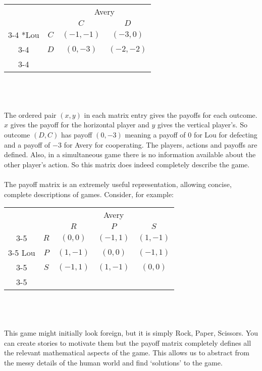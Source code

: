 \setlength{\extrarowheight}{2pt}
\begin{tabular}{cc|c|c|}
	\centering
	& \multicolumn{1}{c}{} & \multicolumn{2}{c}{Avery}\\
	& \multicolumn{1}{c}{} & \multicolumn{1}{c}{$C$}  & \multicolumn{1}{c}{$D$} \\\cline{3-4}
	\multirow{2}*{Lou}  & $C$ & $(-1,-1)$ & $(-3,0)$ \\\cline{3-4}
	& $D$ & $(0,-3)$ & $(-2,-2)$ \\\cline{3-4}
\end{tabular}
\\
\\
\\
The ordered pair $(x,y)$ in each matrix entry gives the payoffs for each outcome. $x$ gives the payoff for the horizontal player and $y$ gives the vertical player's. So outcome $(D,C)$ has payoff $(0,-3)$ meaning a payoff of $0$ for Lou for defecting and a payoff of $-3$ for Avery for cooperating. The players, actions and payoffs are defined. Also, in a simultaneous game there is no information available about the other player's action. So this matrix does indeed completely describe the game.\\
\\
The payoff matrix is an extremely useful representation, allowing concise, complete descriptions of games. Consider, for example:\\
\setlength{\extrarowheight}{2pt}
\begin{tabular}{cc|c|c|c|}
	& \multicolumn{1}{c}{} & \multicolumn{3}{c}{Avery} \\
	& \multicolumn{1}{c}{} & \multicolumn{1}{c}{$R$}  & \multicolumn{1}{c}{$P$}  & \multicolumn{1}{c}{$S$} \\\cline{3-5}
	& $R$ & $(0,0)$ & $(-1,1)$ & $(1,-1)$ \\ \cline{3-5}
	Lou  & $P$ & $(1,-1)$ & $(0,0)$ & $(-1,1)$ \\\cline{3-5}
	& $S$ & $(-1,1)$ & $(1,-1)$ & $(0,0)$ \\\cline{3-5}
\end{tabular}
\\
\\
\\
This game might initially look foreign, but it is simply Rock, Paper, Scissors. You can create stories to motivate them but the payoff matrix completely defines all the relevant mathematical aspects of the game. This allows us to abstract from the messy details of the human world and find `solutions' to the game.
